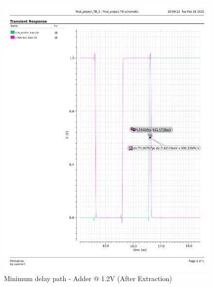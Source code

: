 \documentclass[a4paper,12pt]{article}
\begin{document}
\begin{figure}[H]
    \centering
    \begin{minipage}{0.49\textwidth}
        \centering
        \includegraphics[width=\textwidth]{delay/CP_min_add_1.2_ex.pdf}
        \caption{Minimum delay path - Adder @ 1.2V (After Extraction)}
    \end{minipage}
    \hfill
    \begin{minipage}{0.49\textwidth}
        \centering

\end{minipage}
\end{figure}
\end{document}

